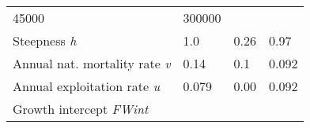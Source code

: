 \documentclass[]{article}
\begin{document}
\begin{longtable}[]{@{}llll@{}}
\begin{minipage}[t]{0.11\columnwidth}
45000\strut
\end{minipage} & \begin{minipage}[t]{0.11\columnwidth}\raggedright\strut
300000\strut
\end{minipage}\tabularnewline
\begin{minipage}[t]{0.56\columnwidth}\raggedright\strut
Steepness \emph{h}\strut
\end{minipage} & \begin{minipage}[t]{0.11\columnwidth}\raggedright\strut
1.0\strut
\end{minipage} & \begin{minipage}[t]{0.11\columnwidth}\raggedright\strut
0.26\strut
\end{minipage} & \begin{minipage}[t]{0.11\columnwidth}\raggedright\strut
0.97\strut
\end{minipage}\tabularnewline
\begin{minipage}[t]{0.56\columnwidth}\raggedright\strut
Annual nat. mortality rate \emph{v}\strut
\end{minipage} & \begin{minipage}[t]{0.11\columnwidth}\raggedright\strut
0.14\strut
\end{minipage} & \begin{minipage}[t]{0.11\columnwidth}\raggedright\strut
0.1\strut
\end{minipage} & \begin{minipage}[t]{0.11\columnwidth}\raggedright\strut
0.092\strut
\end{minipage}\tabularnewline
\begin{minipage}[t]{0.56\columnwidth}\raggedright\strut
Annual exploitation rate \emph{u}\strut
\end{minipage} & \begin{minipage}[t]{0.11\columnwidth}\raggedright\strut
0.079\strut
\end{minipage} & \begin{minipage}[t]{0.11\columnwidth}\raggedright\strut
0.00\strut
\end{minipage} & \begin{minipage}[t]{0.11\columnwidth}\raggedright\strut
0.092\strut
\end{minipage}\tabularnewline
\begin{minipage}[t]{0.56\columnwidth}\raggedright\strut
Growth intercept \emph{FWint}\strut
\end{minipage} & \begin{minipage}[t]{0.11\columnwidth}\raggedright\strut

\end{minipage}
\end{longtable}
\end{document}
